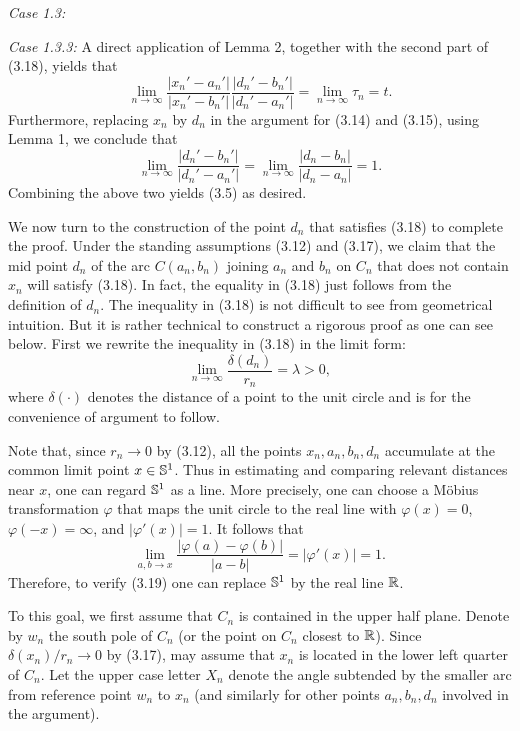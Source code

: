 \documentclass[11pt]{amsart}
\numberwithin{equation}{section}
\theoremstyle{plain}
\theoremstyle{step}
\newenvironment{case}[1]{\par\noindent\textit{Case #1:}}{\par}
\newcommand{\abs}[1]{\lvert#1\rvert}
\newcommand{\Ss}{\Bbb{S}^1}
\newcommand{\R}{\Bbb{R}}
\newcommand{\xnp}{x_n'}
\newcommand{\anp}{a_n'}
\newcommand{\bnp}{b_n'}
\newcommand{\dnp}{d_n'}
\begin{document}
\begin{case}{1.3}
\begin{case}{1.3.3}
A direct application of Lemma 2, together with the second part of (3.18), yields that 
$$\lim_{n\rightarrow\infty}\frac{\abs{\xnp-\anp}}{\abs{\xnp-\bnp}}\frac{\abs{\dnp-\bnp}}{\abs{\dnp-\anp}}=\lim_{n\rightarrow\infty}\tau_n=t.
$$
Furthermore, replacing $x_n$ by $d_n$ in the argument for (3.14) and (3.15), using Lemma 1, we conclude that 
$$\lim_{n\rightarrow\infty}\frac{\abs{\dnp-\bnp}}{\abs{\dnp-\anp}}=\lim_{n\rightarrow\infty}\frac{\abs{d_n-b_n}}{\abs{d_n-a_n}}=1.
$$
Combining the above two yields (3.5) as desired.\par
We now turn to the construction of the point $d_n$ that satisfies (3.18) to complete the proof. Under the standing assumptions (3.12) and (3.17), we claim that the mid point $d_n$ of the arc $C(a_n,b_n)$ joining $a_n$ and $b_n$ on $C_n$ that does not contain $x_n$ will satisfy (3.18). In fact, the equality in (3.18) just follows from the definition of $d_n$. The inequality in (3.18) is not difficult to see from geometrical intuition. But it is rather technical to construct a rigorous proof as one can see below. First we rewrite the inequality in (3.18) in the limit form:
\begin{equation}
    \lim_{n\rightarrow\infty}\frac{\delta(d_n)}{r_n}=\lambda>0,
\end{equation}
where $\delta(\cdot)$ denotes the distance of a point to the unit circle and is for the convenience of argument to follow. 

Note that, since $r_n\rightarrow 0$ by (3.12), all the points $x_n,a_n,b_n,d_n$ accumulate at the common limit point $x\in\Ss$. Thus in estimating and comparing relevant distances near $x$, one can regard $\Ss$ as a line. More precisely, one can choose a M\"obius transformation $\varphi$ that maps the unit circle to the real line with $\varphi(x)=0$, $\varphi(-x)=\infty$, and $|\varphi'(x)|=1$. It follows that
$$\lim_{a,b\rightarrow x}\frac{|\varphi(a)-\varphi(b)|}{|a-b|}=|\varphi'(x)|=1.$$
Therefore, to verify (3.19) one can replace $\Ss$ by the real line $\R$.

To this goal, we first assume that $C_n$ is contained in the upper half plane. Denote by $w_n$ the south pole of $C_n$ (or the point on $C_n$ closest to $\R$). Since $\delta(x_n)/r_n\rightarrow 0$ by (3.17), may assume that $x_n$ is located in the lower left quarter of $C_n$. 
Let the upper case letter $X_n$ denote the angle subtended by the smaller arc from reference point $w_n$ to $x_n$ (and similarly for other points $a_n,b_n,d_n$ involved in the argument). 


\end{case}
\end{case}
\end{document}
